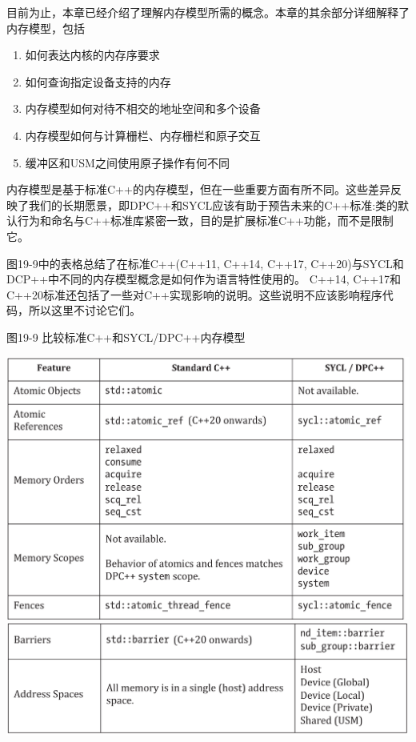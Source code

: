 目前为止，本章已经介绍了理解内存模型所需的概念。本章的其余部分详细解释了内存模型，包括\par

\begin{enumerate}
	\item 如何表达内核的内存序要求
	\item 如何查询指定设备支持的内存
	\item 内存模型如何对待不相交的地址空间和多个设备
	\item 内存模型如何与计算栅栏、内存栅栏和原子交互
	\item 缓冲区和USM之间使用原子操作有何不同
\end{enumerate}

内存模型是基于标准C++的内存模型，但在一些重要方面有所不同。这些差异反映了我们的长期愿景，即DPC++和SYCL应该有助于预告未来的C++标准:类的默认行为和命名与C++标准库紧密一致，目的是扩展标准C++功能，而不是限制它。\par

图19-9中的表格总结了在标准C++(C++11, C++14, C++17, C++20)与SYCL和DCP++中不同的内存模型概念是如何作为语言特性使用的。 C++14, C++17和C++20标准还包括了一些对C++实现影响的说明。这些说明不应该影响程序代码，所以这里不讨论它们。\par

\hspace*{\fill} \par %
图19-9 比较标准C++和SYCL/DPC++内存模型
\begin{center}
	\includegraphics[width=1.0\textwidth]{content/chapter-19/images/6}
	\includegraphics[width=1.0\textwidth]{content/chapter-19/images/7}
\end{center}

